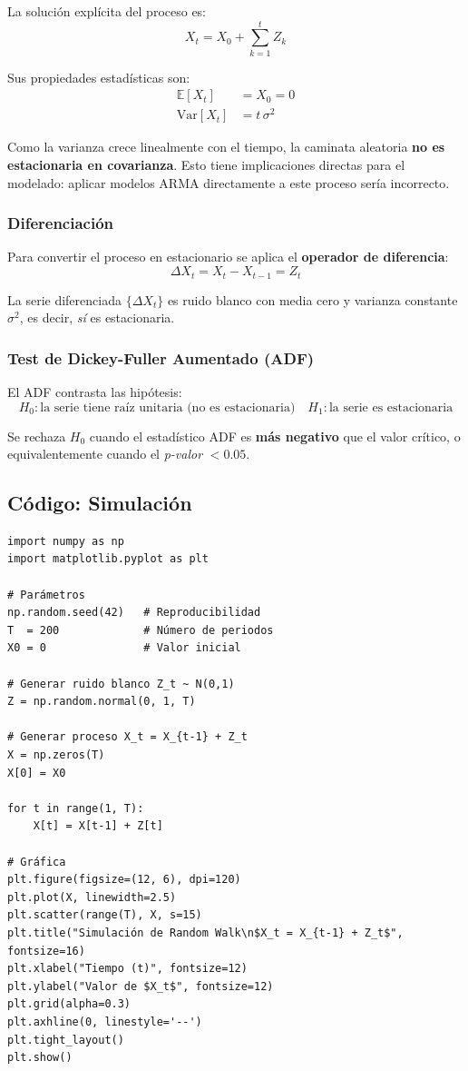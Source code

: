 \documentclass[12pt, a4paper]{article}
\begin{document}
La solución explícita del proceso es:
\[
  X_t = X_0 + \sum_{k=1}^{t} Z_k
\]

Sus propiedades estadísticas son:
\begin{align*}
  \mathbb{E}[X_t] &= X_0 = 0 \\
  \mathrm{Var}[X_t] &= t\,\sigma^2
\end{align*}

Como la varianza crece linealmente con el tiempo, la caminata aleatoria
\textbf{no es estacionaria en covarianza}. Esto tiene implicaciones directas
para el modelado: aplicar modelos ARMA directamente a este proceso sería
incorrecto.

\subsubsection{Diferenciación}

Para convertir el proceso en estacionario se aplica el \textbf{operador de
diferencia}:
\[
  \Delta X_t = X_t - X_{t-1} = Z_t
\]

La serie diferenciada $\{\Delta X_t\}$ es ruido blanco con media cero y
varianza constante $\sigma^2$, es decir, \textit{sí} es estacionaria.

\subsubsection{Test de Dickey-Fuller Aumentado (ADF)}

El ADF contrasta las hipótesis:
\[
  H_0: \text{la serie tiene raíz unitaria (no es estacionaria)} \quad
  H_1: \text{la serie es estacionaria}
\]

Se rechaza $H_0$ cuando el estadístico ADF es \textbf{más negativo} que el
valor crítico, o equivalentemente cuando el \textit{p-valor} $< 0.05$.

\subsection{Código: Simulación}

\begin{lstlisting}[caption={Simulación de la caminata aleatoria}]
import numpy as np
import matplotlib.pyplot as plt

# Parámetros
np.random.seed(42)   # Reproducibilidad
T  = 200             # Número de periodos
X0 = 0               # Valor inicial

# Generar ruido blanco Z_t ~ N(0,1)
Z = np.random.normal(0, 1, T)

# Generar proceso X_t = X_{t-1} + Z_t
X = np.zeros(T)
X[0] = X0

for t in range(1, T):
    X[t] = X[t-1] + Z[t]

# Gráfica
plt.figure(figsize=(12, 6), dpi=120)
plt.plot(X, linewidth=2.5)
plt.scatter(range(T), X, s=15)
plt.title("Simulación de Random Walk\n$X_t = X_{t-1} + Z_t$", fontsize=16)
plt.xlabel("Tiempo (t)", fontsize=12)
plt.ylabel("Valor de $X_t$", fontsize=12)
plt.grid(alpha=0.3)
plt.axhline(0, linestyle='--')
plt.tight_layout()
plt.show()
\end{lstlisting}
\end{document}
